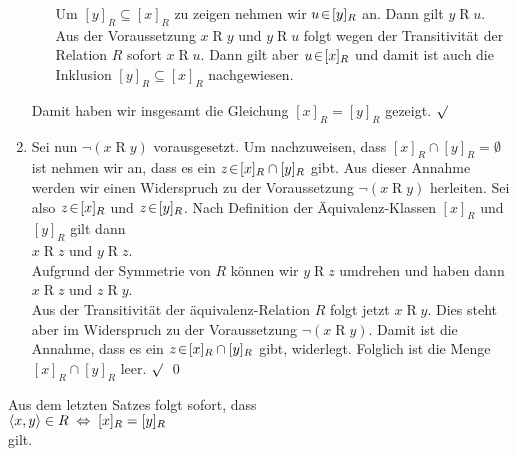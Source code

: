 \begin{enumerate}
\begin{enumerate}
            Um $[y]_R \subseteq [x]_R$ zu zeigen nehmen wir $u \!\in\! [y]_R$ an.
            Dann gilt $y \mathop{R} u$.  Aus der Voraussetzung $x \mathop{R} y$ und
            $y \mathop{R} u$ folgt wegen der Transitivit\"{a}t der Relation $R$ sofort
            $x \mathop{R} u$.  Dann gilt aber $u \!\in\! [x]_R$ und damit ist auch die Inklusion
            $[y]_R \subseteq [x]_R$ nachgewiesen. 
      \end{enumerate}
      Damit haben wir insgesamt die Gleichung $[x]_R = [y]_R$ gezeigt. $\surd$
\item Sei nun $\neg (x \mathop{R} y)$ vorausgesetzt.  Um nachzuweisen,
      dass  $[x]_R \cap [y]_R = \emptyset$ ist nehmen wir an, dass
      es ein $z \!\in\! [x]_R \cap [y]_R$ gibt.  Aus dieser Annahme werden wir einen
      Widerspruch zu der Voraussetzung $\neg (x \mathop{R} y)$ 
        herleiten.  Sei also $z \!\in\![x]_R$ und $z \!\in\! [y]_R$.  Nach Definition
        der \"{A}quivalenz-Klassen $[x]_R$ und $[y]_R$ gilt dann 
      \\[0.2cm]
      \hspace*{1.3cm}      
      $x \mathop{R} z$ \quad und \quad $y \mathop{R} z$.
      \\[0.2cm]
      Aufgrund der Symmetrie von $R$ k\"{o}nnen wir $y \mathop{R} z$ umdrehen und haben dann
      \\[0.2cm]
      \hspace*{1.3cm}      
      $x \mathop{R} z$ \quad und \quad $z \mathop{R} y$.
      \\[0.2cm]
      Aus der Transitivit\"{a}t der \"{a}quivalenz-Relation $R$ folgt jetzt
      $x \mathop{R} y$.
      Dies steht aber im Widerspruch zu der Voraussetzung $\neg (x \mathop{R} y)$.
      Damit ist die Annahme, dass es ein $z \!\in\! [x]_R \cap [y]_R$ gibt, widerlegt.
      Folglich ist die Menge $[x]_R \cap [y]_R$ leer. $\surd$
      \qed
\end{enumerate}

\begin{Korollar}
Aus dem letzten Satzes folgt sofort, dass 
\\[0.2cm]
\hspace*{1.3cm}
$\pair(x,y) \in R \;\Leftrightarrow\; [x]_R = [y]_R$
\\[0.2cm]
gilt. \eox
\end{Korollar}

